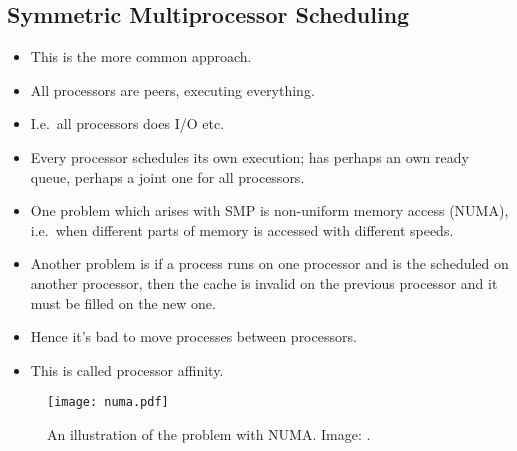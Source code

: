 \documentclass{beamer}
\begin{document}
\subsection{Symmetric Multiprocessor Scheduling}

\begin{frame}{\insertsubsectionhead}
  \begin{itemize}
    \item This is the more common approach.
    \item All processors are peers, executing everything.
    \item I.e.\ all processors does I/O etc.
    \item Every processor schedules its own execution; has perhaps an own ready 
      queue, perhaps a joint one for all processors.
  \end{itemize}
\end{frame}

\begin{frame}{\insertsubsectionhead}
  \begin{itemize}
    \item One problem which arises with SMP is non-uniform memory access 
      (NUMA), i.e.\ when different parts of memory is accessed with different 
      speeds.

    \item Another problem is if a process runs on one processor and is the 
      scheduled on another processor, then the cache is invalid on the previous 
      processor and it must be filled on the new one.

    \item Hence it's bad to move processes between processors.

    \item This is called processor affinity.
  \end{itemize}
\end{frame}

\begin{frame}{\insertsubsectionhead}
  \begin{figure}
    \texttt{[image: numa.pdf]}
    \caption{An illustration of the problem with NUMA.
      Image: \cite{Silberschatz2013osc}.}
  \end{figure}
\end{frame}
\end{document}

